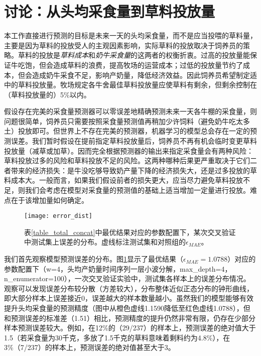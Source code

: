 \section{讨论：从头均采食量到草料投放量}
\label{discussion}

本工作直接进行预测的目标是未来一天的头均采食量，而不是应当投喂的草料量，主要是因为草料的投放受人的主观因素影响，实际草料的投放取决于饲养员的策略。草料的投放是\emph{草料成本}和\emph{奶牛采食量}的这两者的权衡折衷。过高的投放量能保证牛吃饱，但会造成草料的浪费，提高牧场的运营成本；过低的投放量节约了成本，但会造成奶牛采食不足，影响产奶量，降低经济效益。因此饲养员希望制定适中的草料投放量。牧场规定各牛舍最佳草料投放量应使草料有剩余，但剩余控制在（草料投放量的）5\%以内。

假设存在完美的采食量预测器可以零误差地精确预测未来一天各牛棚的采食量，则问题很简单，饲养员只需要按照采食量预测值再稍加少许饲料（避免奶牛吃太多土）投放即可。但世界上不存在完美的预测器，机器学习的模型总会存在一定的预测误差。我们暂时假设在提前指定草料投放量后，饲养员不再有机会临时变更草料投放量（减草或加草）。因而完全根据预测器的输出来指定采食量会有两种风险：草料投放过多的风险和草料投放不足的风险。这两种哪种后果更严重取决于它们二者带来的经济损失：是牛没吃够导致奶产量下降的经济损失大，还是过多投放的草料成本大。一般而言，如果我们假设前者的损失更大，应当尽力避免草料投放不足，则我们会考虑在模型对采食量的预测值的基础上适当增加一定量进行投放。难点在于该增加量如何确定。

\begin{figure}
\begin{center}
	\texttt{[image: error\_dist]}
\caption{表\ref{table_total_concat}中最优结果对应的参数配置下，某次交叉验证中测试集上误差的分布。虚线标注测试集和对照组的$\epsilon_{MAE}$。}
\label{error_dist}
\end{center}
\end{figure}

我们首先观察模型预测误差的分布。图\ref{error_dist}显示了最优结果（$\epsilon_{MAE} = 1.0788$）对应的参数配置下（w=4，头均产奶量时间序列一层小波分解，max\_depth=4，n\_enumerator=100），一次交叉验证实验中，测试集各样本上的误差分布情况。观察可以发现误差分布较分散（方差较大），分布整体近似正态分布的钟形曲线，即大部分样本上误差接近0，误差越大的样本数量越小。虽然我们的模型能够有效提升头均采食量的预测精度（图中从橙色虚线1.1590降低至红色虚线1.0788），但和预测误差的标准差（1.51）相比，预测精度的提升仍然非常有限，仍存在少部分样本预测误差较大。例如，在12\%的（29/237）的样本上，预测误差的绝对值大于1.5（若采食量为30千克，多放了1.5千克的草料意味着剩料约为4.8\%），在3\%（7/237）的样本上，预测误差的绝对值甚至大于3。

